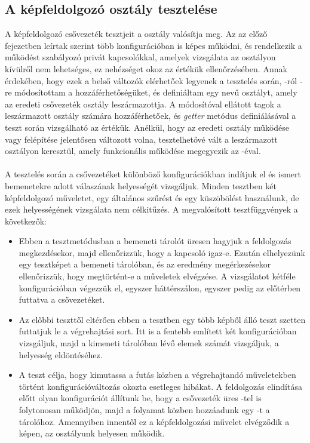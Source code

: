 \subsection{A képfeldolgozó osztály tesztelése}
A képfeldolgozó csővezeték tesztjeit a  osztály valósítja meg. Az  az előző fejezetben leírtak szerint több konfigurációban is képes működni, és rendelkezik a működést szabályozó privát kapcsolókkal, amelyek vizsgálata az osztályon kívülről nem lehetséges, ez nehézséget okoz az értékük ellenőrzésében. Annak érdekében, hogy ezek a belső változók elérhetőek legyenek a tesztelés során, -ról -re módosítottam a hozzáférhetőségüket, és definiáltam egy  nevű osztályt, amely az eredeti csővezeték osztály leszármazottja. A  módosítóval ellátott tagok a leszármazott osztály számára hozzáférhetőek, és \emph{getter} metódus definiálásával a teszt során vizsgálható az értékük. Anélkül, hogy az eredeti osztály működése vagy felépítése jelentősen változott volna, tesztelhetővé vált a leszármazott osztályon keresztül, amely funkcionális működése megegyezik az -éval.\\
\\
A tesztelés során a csővezetéket különböző konfigurációkban indítjuk el és ismert bemenetekre adott válaszának helyességét vizsgáljuk. Minden tesztben két képfeldolgozó műveletet, egy általános szűrést és egy küszöbölést használunk, de ezek helyességének vizsgálata nem célkitűzés. A megvalósított tesztfüggvények a következők:
\begin{itemize}
\item {} Ebben a tesztmetódusban a bemeneti tárolót üresen hagyjuk a feldolgozás megkezdésekor, majd ellenőrizzük, hogy a  kapcsoló igaz-e. Ezután elhelyezünk egy tesztképet a bemeneti tárolóban, és az eredmény megérkezésekor ellenőrizzük, hogy megtörtént-e a műveletek elvégzése. A vizsgálatot kétféle konfigurációban végezzük el, egyszer háttérszálon, egyszer pedig az 
előtérben futtatva a csővezetéket.

\item {} Az előbbi teszttől eltérően ebben a tesztben egy több képből álló teszt szetten futtatjuk le a végrehajtási sort. Itt is a fentebb említett két konfigurációban vizsgáljuk, majd a kimeneti tárolóban lévő elemek számát vizsgáljuk, a helyesség eldöntéséhez.

\item {} A teszt célja, hogy kimutassa a futás közben a végrehajtandó műveletekben történt konfigurációváltozás okozta esetleges hibákat. A feldolgozás elindítása előtt olyan konfigurációt állítunk be, hogy a csővezeték üres -tel is folytonosan működjön, majd a folyamat közben hozzáadunk egy -t a tárolóhoz. Amennyiben innentől ez a képfeldolgozási művelet elvégződik a képen, az osztályunk helyesen működik.

\end{itemize}


